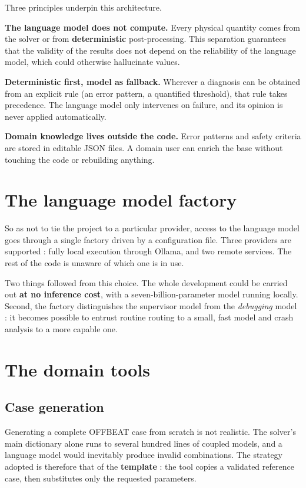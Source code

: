Three principles underpin this architecture.

\textbf{The language model does not compute.} Every physical quantity comes
from the solver or from \textbf{deterministic} post-processing. This separation
guarantees that the validity of the results does not depend on the reliability
of the language model, which could otherwise hallucinate values.

\textbf{Deterministic first, model as fallback.} Wherever a diagnosis can be
obtained from an explicit rule (an error pattern, a quantified threshold), that
rule takes precedence. The language model only intervenes on failure, and its
opinion is never applied automatically.

\textbf{Domain knowledge lives outside the code.} Error patterns and safety
criteria are stored in editable JSON files. A domain user can enrich the base
without touching the code or rebuilding anything.

\section{The language model factory}

So as not to tie the project to a particular provider, access to the language
model goes through a single factory driven by a configuration file. Three
providers are supported : fully local execution through Ollama, and two remote
services. The rest of the code is unaware of which one is in use.

Two things followed from this choice. The whole development could
be carried out \textbf{at no inference cost}, with a seven-billion-parameter
model running locally. Second, the factory distinguishes the supervisor model
from the \textit{debugging} model : it becomes possible to entrust routine
routing to a small, fast model and crash analysis to a more capable one.

\section{The domain tools}

\subsection{Case generation}

Generating a complete OFFBEAT case from scratch is not realistic. The solver's
main dictionary alone runs to several hundred lines of coupled models, and a
language model would inevitably produce invalid combinations. The strategy
adopted is therefore that of the \textbf{template} : the tool copies a validated
reference case, then substitutes only the requested parameters.

